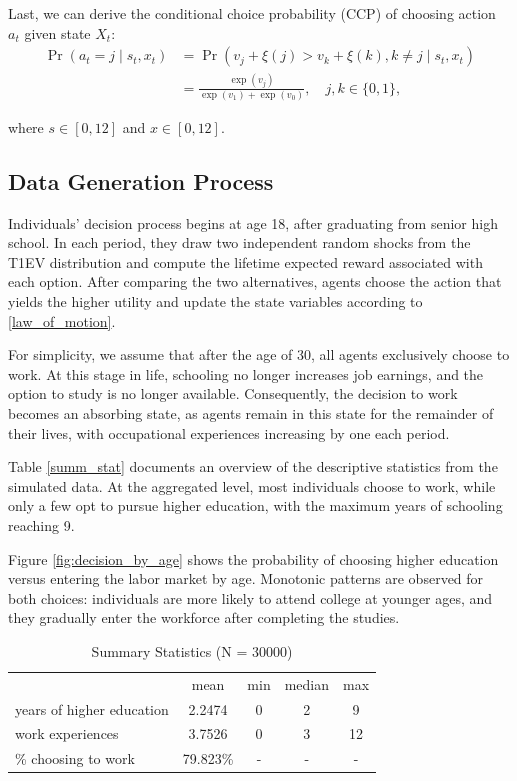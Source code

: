 \documentclass[a4paper, 12pt]{article}
\begin{document}
Last, we can derive the conditional choice probability (CCP) of choosing action $a_t$ given state $X_t$:
\begin{equation}
\begin{split}
\Pr(a_t=j\mid s_t, x_t) &= \Pr(v_j+\xi(j)>v_k+\xi(k), k\neq j\mid s_t, x_t)\\
&= \frac{\exp(v_j)}{\exp(v_1)+\exp(v_0)}, \quad j,k\in\{0,1\}, 
\label{ccp}
\end{split}
\end{equation}

where $s\in[0,12]$ and $x\in[0,12]$.

\subsection{Data Generation Process}
Individuals’ decision process begins at age 18, after graduating from senior high school. 
In each period, they draw two independent random shocks from the T1EV distribution and compute the lifetime expected reward associated with each option. 
After comparing the two alternatives, agents choose the action that yields the higher utility and update the state variables according to \eqref{law_of_motion}. 

For simplicity, we assume that after the age of 30, all agents exclusively choose to work. 
At this stage in life, schooling no longer increases job earnings, and the option to study is no longer available. 
Consequently, the decision to work becomes an absorbing state, as agents remain in this state for the remainder of their lives, with occupational experiences increasing by one each period.

Table \eqref{summ_stat} documents an overview of the descriptive statistics from the simulated data.
At the aggregated level, most individuals choose to work,
while only a few opt to pursue higher education, with the maximum years of schooling reaching 9.

Figure \eqref{fig:decision_by_age} shows the probability of choosing higher education versus entering the labor market by age. 
Monotonic patterns are observed for both choices: individuals are more likely to attend college at younger ages,
and they gradually enter the workforce after completing the studies.
\begin{table}[hpbt]
\centering
\begin{tabular}{lcccc}
\toprule
& mean    & min & median & max \\ 
\cmidrule(lr){2-5}
years of higher education & 2.2474 & 0 & 2  & 9  \\
\addlinespace
work experiences   & 3.7526 & 0  & 3   & 12  \\ 
\addlinespace
\% choosing to work    & 79.823\%    & -      & -   & -   \\ 
\bottomrule
\end{tabular}
\caption{Summary Statistics (N = 30000)}
\label{summ_stat}
\end{table}
\end{document}
